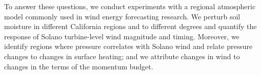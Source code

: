To answer these questions, we conduct experiments with a regional atmospheric model commonly used in wind energy forecasting research.  We perturb soil moisture in different California regions and to different degrees and quantify the response of Solano turbine-level wind magnitude and timing.  Moreover, we identify regions where pressure correlates with Solano wind and relate pressure changes to changes in surface heating; and we attribute changes in wind to changes in the terms of the momentum budget.

%